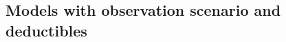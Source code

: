 \documentclass[11pt]{article}
\begin{document}




\subsection{Models with observation scenario and deductibles}\label{section:exoendo}
\end{document}
